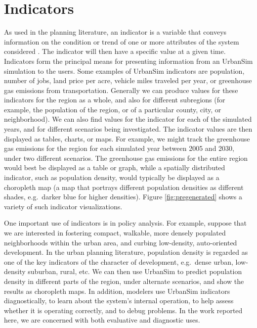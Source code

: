 
\section{Indicators}
\label{sec:indicators}

As used in the planning literature, an indicator is a variable that conveys
information on the condition or trend of one or more attributes of the
system considered \cite{gallopin-1997,hart-book-1999}.  The indicator will
then have a specific value at a given time.  Indicators form the principal
means for presenting information from an UrbanSim simulation to the users.
Some examples of UrbanSim indicators are population, number of jobs, land
price per acre, vehicle miles traveled per year, or greenhouse gas
emissions from transportation.  Generally we can produce values for these
indicators for the region as a whole, and also for different subregions (for
example, the population of the region, or of a particular county, city, or
neighborhood).  We can also find values for the indicator for each of the
simulated years, and for different scenarios being investigated.  The
indicator values are then displayed as tables, charts, or maps.  For
example, we might track the greenhouse gas emissions for the region for
each simulated year between 2005 and 2030, under two different scenarios.
The greenhouse gas emissions for the entire region 
would best be displayed as a table
or graph, while a spatially distributed indicator, such as population
density, would typically be displayed as a choropleth map (a map that
portrays different population densities as different shades, e.g.\ darker
blue for higher densities).  Figure \ref{fig:pregenerated} shows a variety
of such indicator visualizations.

One important use of indicators is in policy analysis.  For example,
suppose that we are interested in fostering compact, walkable, more densely
populated neighborhoods within the urban area, and curbing low-density,
auto-oriented development.  In the urban planning literature, population
density is regarded as one of the key indicators of the character of
development, e.g.\ dense urban, low-density suburban, rural, etc.  We can
then use UrbanSim to predict population density in different parts of the
region, under alternate scenarios, and show the results as choropleth maps.
In addition, modelers use UrbanSim indicators diagnostically, to learn
about the system's internal operation, to help assess whether it is
operating correctly, and to debug problems.  In the work reported here, we
are concerned with both evaluative and diagnostic uses.



